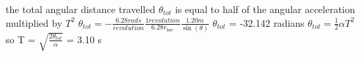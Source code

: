 the total angular distance travelled $\theta_{tot}$ is equal to half of\newline
the angular acceleration multiplied by $T^{2}$\newline
$\theta_{tot} = -\frac{6.28 rads}{revolution} \frac{1 revolution}{6.28r_{bar}} \frac{1.20 m}{\sin(\theta)}$\newline
$\theta_{tot}$ = -32.142 radians\newline
$\theta_{tot} = \frac{1}{2} \alpha T^{2}$\newline
so T = $\sqrt{\frac{2 \theta_{tot}}{\alpha}}$ = 3.10 s


